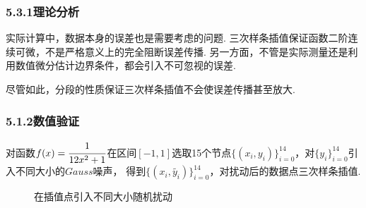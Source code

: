 \documentclass[12pt]{article}
\begin{document}
\subsubsection*{{\small 5.3.1}\quad\small\heiti 理论分析} 
\par 实际计算中，数据本身的误差也是需要考虑的问题. 三次样条插值保证函数二阶连续可微，不是严格意义上的完全阻断误差传播. 另一方面，不管是实际测量还是利用数值微分估计边界条件，都会引入不可忽视的误差. 
\par 尽管如此，分段的性质保证三次样条插值不会使误差传播甚至放大.

\subsubsection*{{\small 5.1.2}\quad\small\heiti 数值验证} 
\par 对函数$f(x)=\cfrac{1}{12x^{2}+1}$在区间$[-1,1]$选取15个节点$\{(x_{i},y_{i})\}_{i=0}^{14}$，对$\{y_{i}\}_{i=0}^{14}$引入不同大小的$Gauss$噪声，
得到$\{(x_{i},\tilde{y_{i}})\}_{i=0}^{14}$，对扰动后的数据点三次样条插值.

\begin{figure}[h]
	\label{fig06} 
	\caption{在插值点引入不同大小随机扰动}
\end{figure}
\end{document}
